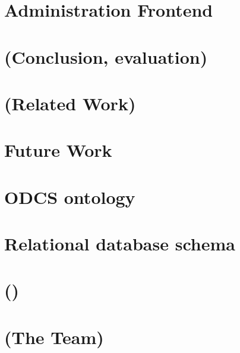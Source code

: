 \chapter{Administration Frontend}

\chapter{(Conclusion, evaluation)}

\chapter{(Related Work)}

\chapter{Future Work}




\appendix

\chapter{ODCS ontology}

\chapter{Relational database schema}


\chapter{()}

\chapter{(The Team)}



